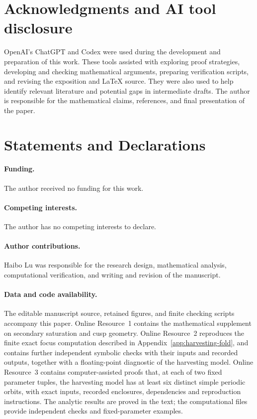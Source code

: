 \section*{Acknowledgments and AI tool disclosure}

OpenAI’s ChatGPT and Codex were used during the development and preparation of this work. These tools assisted with exploring proof strategies, developing and checking mathematical arguments, preparing verification scripts, and revising the exposition and LaTeX source. They were also used to help identify relevant literature and potential gaps in intermediate drafts. The author is responsible for the mathematical claims, references, and final presentation of the paper.

\section*{Statements and Declarations}

\paragraph{Funding.}
The author received no funding for this work.

\paragraph{Competing interests.}
The author has no competing interests to declare.

\paragraph{Author contributions.}
Haibo Lu was responsible for the research design, mathematical analysis,
computational verification, and writing and revision of the manuscript.

\paragraph{Data and code availability.}
The editable manuscript source, retained figures, and finite checking scripts
accompany this paper. Online Resource~1 contains the mathematical
supplement on secondary saturation and cusp geometry. Online Resource~2
reproduces the finite exact focus computation described in
Appendix~\ref{app:harvesting-fold}, and contains further independent symbolic
checks with their inputs and recorded outputs, together with a floating-point
diagnostic of the harvesting model. Online
Resource~3 contains computer-assisted proofs that, at each of two fixed parameter
tuples, the harvesting model has at least six distinct simple periodic orbits,
with exact inputs, recorded enclosures, dependencies and
reproduction instructions. The analytic results are proved in the text; the
computational files provide independent checks and fixed-parameter
examples.

